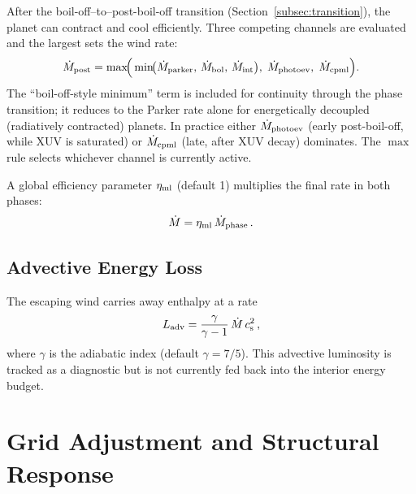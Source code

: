 \documentclass{aastex701}
\newcommand{\Mdot}{\dot{M}}
\newcommand{\cs}{c_{\rm s}}
\newcommand{\Ladv}{L_{\rm adv}}
\begin{document}
After the boil-off--to--post-boil-off transition (Section~\ref{subsec:transition}),
the planet can contract and cool efficiently.  Three competing channels
are evaluated and the largest sets the wind rate:
\begin{equation}\label{eq:mdot_postbo}
  \Mdot_{\rm post}
    = \max\!\Bigl(\,
        \min\!\bigl(\Mdot_{\rm parker},\,\Mdot_{\rm bol},\,\Mdot_{\rm int}\bigr),
        \;
        \Mdot_{\rm photoev},
        \;
        \Mdot_{\rm cpml}
      \Bigr).
\end{equation}
The ``boil-off-style minimum'' term is included for continuity through
the phase transition; it reduces to the Parker rate alone for
energetically decoupled (radiatively contracted) planets.  In practice
either $\Mdot_{\rm photoev}$ (early post-boil-off, while XUV is
saturated) or $\Mdot_{\rm cpml}$ (late, after XUV decay) dominates.
The $\max$ rule selects whichever channel is currently active.

A global efficiency parameter $\eta_{\rm ml}$ (default 1) multiplies
the final rate in both phases:
\begin{equation}\label{eq:eta}
  \Mdot = \eta_{\rm ml}\,\Mdot_{\rm phase}\,.
\end{equation}

\subsection{Advective Energy Loss}\label{subsec:Ladv}

The escaping wind carries away enthalpy at a rate
\citep[Equation~2 of][]{Tang2024}
\begin{equation}\label{eq:Ladv}
  \Ladv = \frac{\gamma}{\gamma - 1}\,\Mdot\,\cs^{2}\,,
\end{equation}
where $\gamma$ is the adiabatic index (default $\gamma = 7/5$).
This advective luminosity is tracked as a diagnostic but is not
currently fed back into the interior energy budget.

\section{Grid Adjustment and Structural Response}\label{sec:grid}
\end{document}
